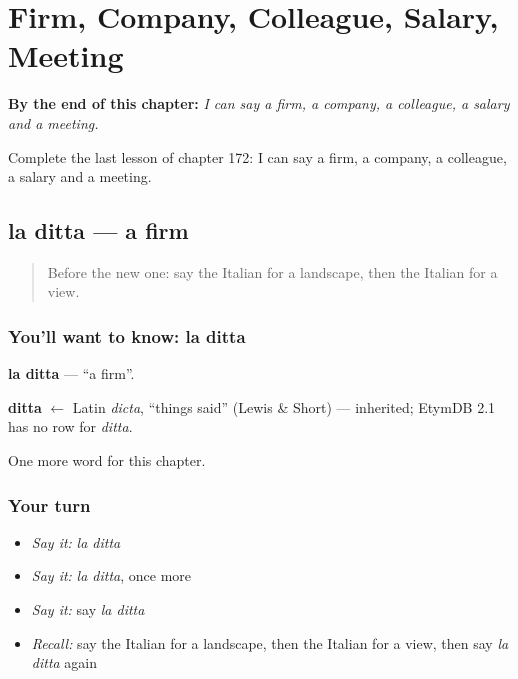 
\chapter{Firm, Company, Colleague, Salary, Meeting}
\label{ch:it-firm-company-colleague-salary-meeting}

\begin{chapteropening}
\textbf{By the end of this chapter:} \emph{I can say a firm, a company, a colleague, a salary and a meeting.}

Complete the last lesson of chapter 172: I can say a firm, a company, a colleague, a salary and a meeting.
\end{chapteropening}

\section[la ditta]{la ditta — a firm}

\label{lesson:IT-C172-ditta}



\begin{quote}
Before the new one: say the Italian for a landscape, then the Italian for a view.
\end{quote}

\subsection*{You'll want to know: la ditta}
\textbf{la ditta} — \textquotedblleft{}a firm\textquotedblright{}.

\begin{cousinweb}
\textbf{ditta} $\leftarrow$ Latin \emph{dicta}, \textquotedblleft{}things said\textquotedblright{} (Lewis \& Short) — inherited; EtymDB 2.1 has no row for \emph{ditta}.
\end{cousinweb}

\begin{grammarlens}[title={What you've built}]
One more word for this chapter.
\end{grammarlens}

\subsection*{Your turn}
\begin{itemize}
\raggedright
  \item \emph{Say it:} \emph{la ditta}
  \item \emph{Say it:} \emph{la ditta}, once more
  \item \emph{Say it:} say \emph{la ditta}
  \item \emph{Recall:} say the Italian for a landscape, then the Italian for a view, then say \emph{la ditta} again
\end{itemize}

